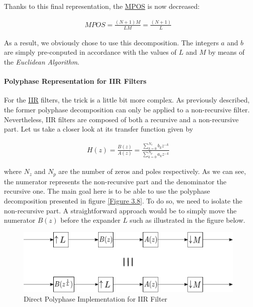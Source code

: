 Thanks to this final representation, the \hyperlink{MPOS}{MPOS} is now decreased:

\begin{align}
	MPOS =  \frac{(N+1)M}{LM} = \frac{(N+1)}{L}\label{eqn:final_poly}
\end{align}

As a result, we obviously chose to use this decomposition. The integers $a$ and $b$ are simply pre-conputed in accordance with the values of $L$ and $M$ by means of the \textit{Euclidean Algorithm}.

\newpage
\paragraph{Polyphase Representation for IIR Filters}

\justify

For the \hyperlink{IIR}{IIR} filters, the trick is a little bit more complex. As previously described, the former polyphase decomposition can only be applied to a non-recursive filter. Nevertheless, IIR filters are composed of both a recursive and a non-recursive part. Let us take a closer look at its transfer function given by 

\begin{align}
	H(z) = \frac{B(z)}{A(z)} =  \frac{\sum\limits_{k=0}^{N_z} b_kz^{-k} }{\sum\limits_{k=0}^{N_p} a_kz^{-k}}
	\label{eqn:3.14}
\end{align}

where $N_z$ and $N_p$ are the number of zeros and poles respectively. As we can see, the numerator represents the non-recursive part and the denominator the recursive one. The main goal here is to be able to use the polyphase decomposition presented in figure \ref{Figure 3.8}. To do so, we need to isolate the non-recursive part. A straightforward approach would be to simply move the numerator $B(z)$ before the expander $L$ such as illustrated in the figure below.

\begin{figure}[ht!]
	\centering
	\includegraphics[scale=0.8]{iir_direct_poly.pdf}
	\caption{Direct Polyphase Implementation for IIR Filter}
	\label{Figure 3.9}
\end{figure}


